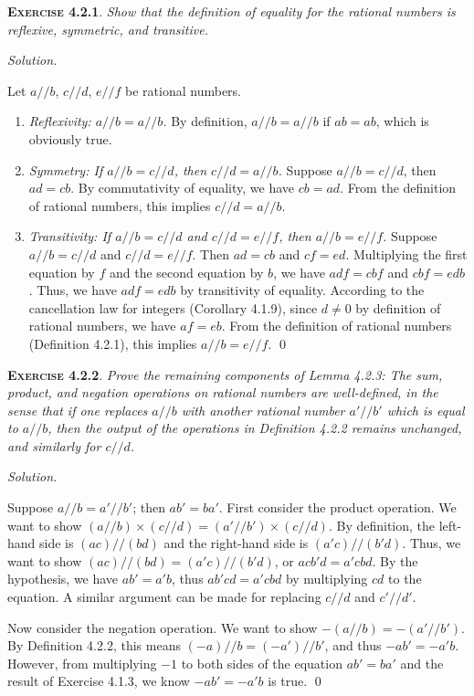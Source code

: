 \documentclass[12pt]{article}
\theoremstyle{remark}
\newenvironment{exer}[2]{
    \noindent \setlength{\parskip}{1em}%
    \textsc{\textbf{Exercise #1}}. \textit{#2} \par
    \noindent \textit{Solution.} %
}{\bigskip}
\begin{document}
\begin{exer}{4.2.1}{
    Show that the definition of equality for the rational numbers is reflexive, symmetric, and transitive.
}
    Let $a // b$, $c // d$, $e // f$ be rational numbers.
    \begin{enumerate}[topsep=0mm,label=(\alph*)]
        \item \textit{Reflexivity: $a // b = a // b$.}
            By definition, $a // b = a // b$ if $ab = ab$, which is obviously true.

        \item \textit{Symmetry: If $a // b = c // d$, then $c // d = a // b$.}
            Suppose $a // b = c // d$, then $ad = cb$.
            By commutativity of equality, we have $cb = ad$.
            From the definition of rational numbers, this implies $c // d  = a // b$.

        \item \textit{Transitivity: If $a // b = c // d$ and $c // d = e // f$, then $a // b = e // f$.}
            Suppose $a // b = c // d$ and $c // d = e // f$.
            Then $ad = cb$ and $cf = ed$.
            Multiplying the first equation by $f$ and the second equation by $b$, we have $adf = cbf$ and $cbf = edb$.
            Thus, we have $adf = edb$ by transitivity of equality.
            According to the cancellation law for integers (Corollary 4.1.9), since $d \ne 0$ by definition of rational numbers, we have $af = eb$.
            From the definition of rational numbers (Definition 4.2.1), this implies $a//b = e//f$. \qed
    \end{enumerate}
\end{exer}


\begin{exer}{4.2.2}{
    Prove the remaining components of Lemma 4.2.3:
    The sum, product, and negation operations on rational numbers are well-defined, in the sense that if one replaces $a // b$ with another rational number $a' // b'$ which is equal to $a // b$, then the output of the operations in Definition 4.2.2 remains unchanged, and similarly for $c // d$.
}
    Suppose $a // b = a' // b'$; then $ab' = ba'$.
    First consider the product operation.
    We want to show $(a // b) \times (c // d) = (a' // b') \times (c // d)$.
    By definition, the left-hand side is $(ac) // (bd)$ and the right-hand side is $(a'c) // (b'd)$.
    Thus, we want to show $(ac) // (bd) = (a'c) // (b'd)$, or $acb'd = a'cbd$.
    By the hypothesis, we have $ab' = a'b$, thus $ab'cd = a'cbd$ by multiplying $cd$ to the equation.
    A similar argument can be made for replacing $c // d$ and $c' // d'$.

    Now consider the negation operation.
    We want to show $-(a // b) = -(a' // b')$.
    By Definition 4.2.2, this means $(-a) // b = (-a') // b'$, and thus $-ab' = -a'b$.
    However, from multiplying $-1$ to both sides of the equation $ab' = ba'$ and the result of Exercise 4.1.3, we know $-ab' = -a'b$ is true. \qed
\end{exer}
\end{document}
